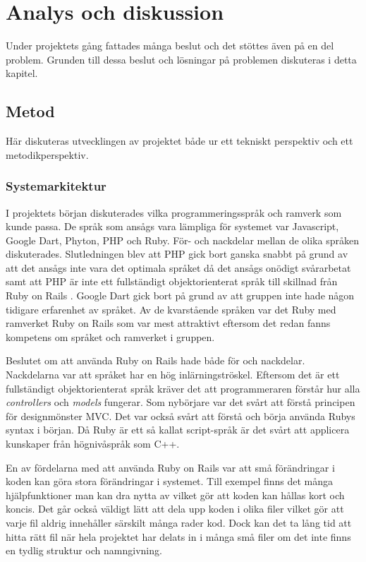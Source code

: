 \chapter{Analys och diskussion}

Under projektets gång fattades många beslut och det stöttes även på en del
problem. Grunden till dessa beslut och lösningar på problemen diskuteras i
detta kapitel.

\section{Metod}

Här diskuteras utvecklingen av projektet både ur ett tekniskt perspektiv och
ett metodikperspektiv.

\subsection{Systemarkitektur}

I projektets början diskuterades vilka programmeringsspråk och ramverk som
kunde passa. De språk som ansågs vara lämpliga för systemet var Javascript,
Google Dart, Phyton, PHP och Ruby. För- och nackdelar mellan de olika språken
diskuterades. Slutledningen blev att PHP gick bort ganska snabbt på grund av
att det ansågs inte vara det optimala språket då det ansågs onödigt svårarbetat
samt att PHP är inte ett fullständigt objektorienterat språk till skillnad från
Ruby on Rails \cite{shiftdynamic}. Google Dart gick bort på grund av att
gruppen inte hade någon tidigare erfarenhet av språket. Av de kvarstående
språken var det Ruby med ramverket Ruby on Rails som var mest attraktivt
eftersom det redan fanns kompetens om språket och ramverket i gruppen.

Beslutet om att använda Ruby on Rails hade både för och nackdelar. Nackdelarna
var att språket har en hög inlärningströskel. Eftersom det är ett fullständigt
objektorienterat språk kräver det att programmeraren förstår hur alla
\emph{controllers} och \emph{models} fungerar. Som nybörjare var det svårt att
förstå principen för designmönster MVC. Det var också svårt att förstå och
börja använda Rubys syntax i början. Då Ruby är ett så kallat script-språk är
det svårt att applicera kunskaper från högnivåspråk som C++.

En av fördelarna med att använda Ruby on Rails var att små förändringar i koden
kan göra stora förändringar i systemet. Till exempel finns det många
hjälpfunktioner man kan dra nytta av vilket gör att koden kan hållas kort och
koncis. Det går också väldigt lätt att dela upp koden i olika filer vilket gör
att varje fil aldrig innehåller särskilt många rader kod. Dock kan det ta lång
tid att hitta rätt fil när hela projektet har delats in i många små filer om
det inte finns en tydlig struktur och namngivning.

